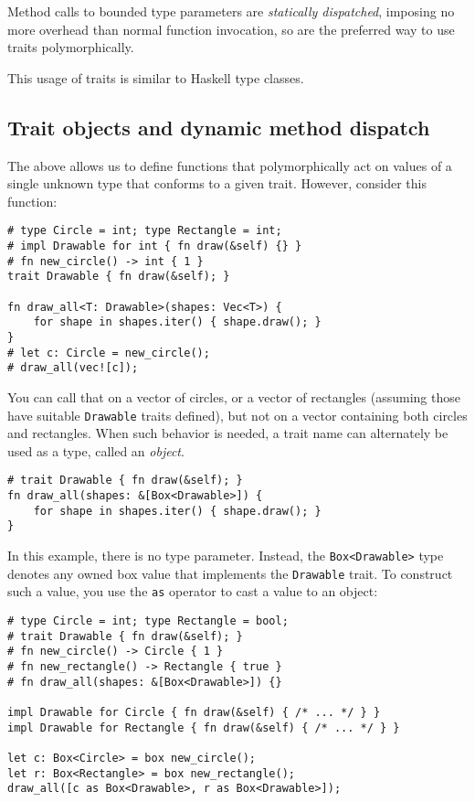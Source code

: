 \documentclass[]{article}
\begin{document}
Method calls to bounded type parameters are \emph{statically
dispatched}, imposing no more overhead than normal function invocation,
so are the preferred way to use traits polymorphically.

This usage of traits is similar to Haskell type classes.

\subsection{Trait objects and dynamic method
dispatch}\label{trait-objects-and-dynamic-method-dispatch}

The above allows us to define functions that polymorphically act on
values of a single unknown type that conforms to a given trait. However,
consider this function:

\begin{verbatim}
# type Circle = int; type Rectangle = int;
# impl Drawable for int { fn draw(&self) {} }
# fn new_circle() -> int { 1 }
trait Drawable { fn draw(&self); }

fn draw_all<T: Drawable>(shapes: Vec<T>) {
    for shape in shapes.iter() { shape.draw(); }
}
# let c: Circle = new_circle();
# draw_all(vec![c]);
\end{verbatim}

You can call that on a vector of circles, or a vector of rectangles
(assuming those have suitable \texttt{Drawable} traits defined), but not
on a vector containing both circles and rectangles. When such behavior
is needed, a trait name can alternately be used as a type, called an
\emph{object}.

\begin{verbatim}
# trait Drawable { fn draw(&self); }
fn draw_all(shapes: &[Box<Drawable>]) {
    for shape in shapes.iter() { shape.draw(); }
}
\end{verbatim}

In this example, there is no type parameter. Instead, the
\texttt{Box\textless{}Drawable\textgreater{}} type denotes any owned box
value that implements the \texttt{Drawable} trait. To construct such a
value, you use the \texttt{as} operator to cast a value to an object:

\begin{verbatim}
# type Circle = int; type Rectangle = bool;
# trait Drawable { fn draw(&self); }
# fn new_circle() -> Circle { 1 }
# fn new_rectangle() -> Rectangle { true }
# fn draw_all(shapes: &[Box<Drawable>]) {}

impl Drawable for Circle { fn draw(&self) { /* ... */ } }
impl Drawable for Rectangle { fn draw(&self) { /* ... */ } }

let c: Box<Circle> = box new_circle();
let r: Box<Rectangle> = box new_rectangle();
draw_all([c as Box<Drawable>, r as Box<Drawable>]);
\end{verbatim}
\end{document}

